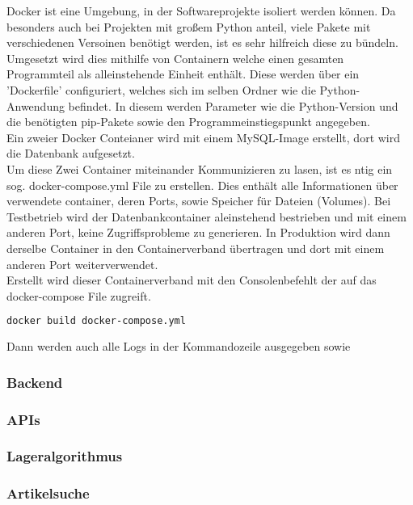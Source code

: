     Docker ist eine Umgebung, in der Softwareprojekte isoliert werden können. Da besonders auch bei Projekten mit großem Python anteil, viele Pakete mit verschiedenen Versoinen benötigt werden, ist es sehr hilfreich diese zu bündeln. \\
    Umgesetzt wird dies mithilfe von Containern welche einen gesamten Programmteil als alleinstehende Einheit enthält. Diese werden über ein 'Dockerfile' configuriert, welches sich im selben Ordner wie die Python-Anwendung befindet. In diesem werden Parameter wie die Python-Version und die benötigten pip-Pakete sowie den Programmeinstiegspunkt angegeben. \\ 
    Ein zweier Docker Conteianer wird mit einem MySQL-Image erstellt, dort wird die Datenbank aufgesetzt. \\
    Um diese Zwei Container miteinander Kommunizieren zu lasen, ist es ntig ein sog. docker-compose.yml File zu erstellen. Dies enthält alle Informationen über verwendete container, deren Ports, sowie Speicher für Dateien (Volumes). Bei Testbetrieb wird der Datenbankcontainer aleinstehend bestrieben und mit einem anderen Port, keine Zugriffsprobleme zu generieren. In Produktion wird dann derselbe Container in den Containerverband übertragen und dort mit einem anderen Port weiterverwendet. \\
    Erstellt wird dieser Containerverband mit den Consolenbefehlt der auf das docker-compose File zugreift. 
    \begin{lstlisting}[language=bash]
        docker build docker-compose.yml\end{lstlisting}
    Dann werden auch alle Logs in der Kommandozeile ausgegeben sowie 


\subsubsection{Backend}
\subsubsection{APIs}
\subsubsection{Lageralgorithmus}
\subsubsection{Artikelsuche}
